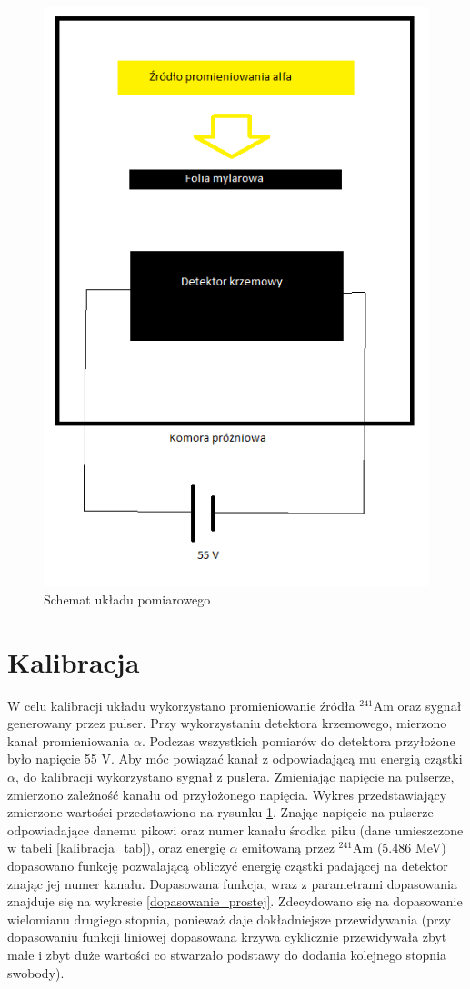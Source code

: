 \documentclass[12pt,a4paper]{article}
\newcommand{\Ameryk}{${}^{241}_{}{}$Am }
\begin{document}
\begin{figure}[H]
\centering
\includegraphics[scale=0.5]{schemat.png}
\caption{Schemat układu pomiarowego}
\label{kalibracja}
\end{figure}

\section{Kalibracja}
W celu kalibracji układu wykorzystano promieniowanie źródła \Ameryk oraz sygnał generowany przez pulser. Przy wykorzystaniu detektora krzemowego, mierzono kanał promieniowania $\alpha$. Podczas wszystkich pomiarów do detektora przyłożone było napięcie 55 V. Aby móc powiązać kanał z odpowiadającą mu energią cząstki $\alpha$, do kalibracji wykorzystano sygnał z puslera. Zmieniając napięcie  na pulserze, zmierzono zależność kanału od przyłożonego napięcia. Wykres przedstawiający zmierzone wartości przedstawiono na rysunku \ref{kalibracja}. Znając napięcie na pulserze odpowiadające danemu pikowi oraz numer kanału środka piku (dane umieszczone w tabeli \ref{kalibracja_tab}), oraz energię $\alpha$ emitowaną przez \Ameryk  (5.486 MeV) dopasowano funkcję pozwalającą obliczyć energię cząstki padającej na detektor znając jej numer kanału. Dopasowana funkcja, wraz z parametrami dopasowania znajduje się na wykresie \ref{dopasowanie_prostej}. Zdecydowano się na dopasowanie wielomianu drugiego stopnia, ponieważ daje dokładniejsze przewidywania (przy dopasowaniu funkcji liniowej dopasowana krzywa cyklicznie przewidywała zbyt małe i zbyt duże wartości co stwarzało podstawy do dodania kolejnego stopnia swobody). 
\end{document}
